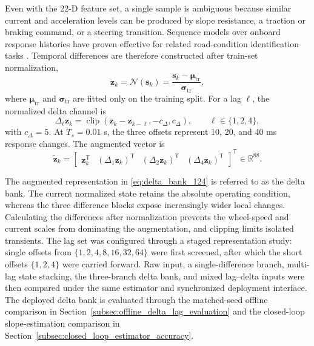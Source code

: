 \documentclass{ieeeaccess}
\newcommand{\citep}[1]{\cite{#1}}
\begin{document}
Even with the 22-D feature set, a single sample is ambiguous because similar current and acceleration levels can be produced by slope resistance, a traction or braking command, or a steering transition. Sequence models over onboard response histories have proven effective for related road-condition identification tasks \citep{Liang2022LSTMRoadID}. Temporal differences are therefore constructed after train-set normalization,
\begin{equation}
\mathbf z_k=\mathcal N(\mathbf s_k)
=\frac{\mathbf s_k-\boldsymbol\mu_{\mathrm{tr}}}
{\boldsymbol\sigma_{\mathrm{tr}}},
\label{eq:feature_train_normalization}
\end{equation}
where $\boldsymbol\mu_{\mathrm{tr}}$ and $\boldsymbol\sigma_{\mathrm{tr}}$ are fitted only on the training split. For a lag $\ell$, the normalized delta channel is
\begin{equation}
\Delta_{\ell}\mathbf z_k=
\operatorname{clip}\!\left(
\mathbf z_k-\mathbf z_{k-\ell},-c_{\Delta},c_{\Delta}
\right),\qquad \ell\in\{1,2,4\},
\label{eq:multiscale_delta_lag}
\end{equation}
with $c_{\Delta}=5$. At $T_s=0.01$ s, the three offsets represent 10, 20, and 40 ms response changes. The augmented vector is
\begin{equation}
\widetilde{\mathbf z}_k=
\begin{bmatrix}
\mathbf z_k^{\mathsf T}&
(\Delta_1\mathbf z_k)^{\mathsf T}&
(\Delta_2\mathbf z_k)^{\mathsf T}&
(\Delta_4\mathbf z_k)^{\mathsf T}
\end{bmatrix}^{\mathsf T}
\in\mathbb R^{88}.
\label{eq:delta_bank_124}
\end{equation}

The augmented representation in \eqref{eq:delta_bank_124} is referred to as the delta bank. The current normalized state retains the absolute operating condition, whereas the three difference blocks expose increasingly wider local changes. Calculating the differences after normalization prevents the wheel-speed and current scales from dominating the augmentation, and clipping limits isolated transients. The lag set was configured through a staged representation study: single offsets from $\{1,2,4,8,16,32,64\}$ were first screened, after which the short offsets $\{1,2,4\}$ were carried forward. Raw input, a single-difference branch, multi-lag state stacking, the three-branch delta bank, and mixed lag--delta inputs were then compared under the same estimator and synchronized deployment interface. The deployed delta bank is evaluated through the matched-seed offline comparison in Section~\ref{subsec:offline_delta_lag_evaluation} and the closed-loop slope-estimation comparison in Section~\ref{subsec:closed_loop_estimator_accuracy}.
\end{document}
